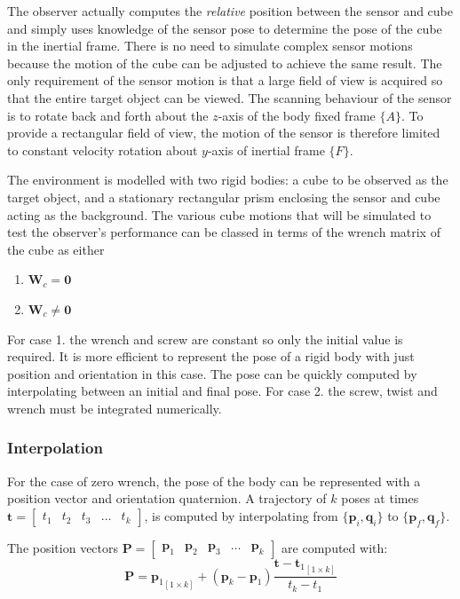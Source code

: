 The observer actually computes the \textit{relative} position between the sensor and cube and simply uses knowledge of the sensor pose to determine the pose of the cube in the inertial frame. There is no need to simulate complex sensor motions because the motion of the cube can be adjusted to achieve the same result. The only requirement of the sensor motion is that a large field of view is acquired so that the entire target object can be viewed. The scanning behaviour of the sensor is to rotate back and forth about the $z$-axis of the body fixed frame $\{A\}$. To provide a rectangular field of view, the motion of the sensor is therefore limited to constant velocity rotation about $y$-axis of inertial frame $\{F\}$.

The environment is modelled with two rigid bodies: a cube to be observed as the target object, and a stationary rectangular prism enclosing the sensor and cube acting as the background. The various cube motions that will be simulated to test the observer's performance can be classed in terms of the wrench matrix of the cube as either
\begin{enumerate}
\item ${\textbf{W}_c} = \textbf{0}$
\item ${\textbf{W}_c} \neq \textbf{0}$
\end{enumerate}

For case 1. the wrench and screw are constant so only the initial value is required. It is more efficient to represent the pose of a rigid body with just position and orientation in this case. The pose can be quickly computed by interpolating between an initial and final pose. For case 2. the screw, twist and wrench must be integrated numerically.

\subsubsection{Interpolation}
For the case of zero wrench, the pose of the body can be represented with a position vector and orientation quaternion. A trajectory of $k$ poses at times 
$\mathbf{t} =
\begin{bmatrix}
	t_1 & t_2 & t_3 & \dots & t_k
\end{bmatrix}$,
is computed by interpolating from $\{\mathbf{p}_i,\mathbf{q}_i\}$ to $\{\mathbf{p}_f,\mathbf{q}_f\}$.

The position vectors
$\mathbf{P}= \begin{bmatrix}
\mathbf{p}_1 & \mathbf{p}_2 & \mathbf{p}_3 & \dots & \mathbf{p}_k
\end{bmatrix}$
 are computed with:
\begin{equation}
	\mathbf{P} = 
	{\mathbf{p}_1}_{[1 \times k]} + (\mathbf{p}_k - \mathbf{p}_1)\frac{\mathbf{t}-{\mathbf{t}_1}_{[1 \times k]}}{t_k - t_1}
\end{equation}

